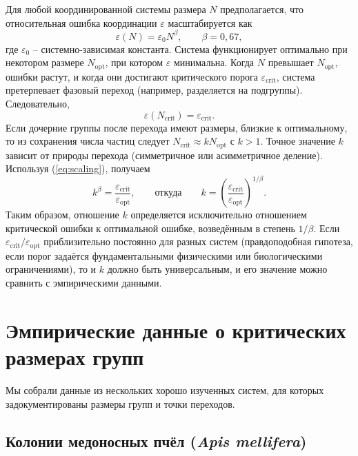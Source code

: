 \documentclass[12pt]{article}
\theoremstyle{remark}
\begin{document}
	Для любой координированной системы размера $N$ предполагается, что относительная ошибка координации $\varepsilon$ масштабируется как
	\begin{equation}
		\varepsilon(N) = \varepsilon_0 N^{\beta}, \qquad \beta = 0,67,
		\label{eq:scaling}
	\end{equation}
	где $\varepsilon_0$ – системно-зависимая константа. Система функционирует оптимально при некотором размере $N_{\text{opt}}$, при котором $\varepsilon$ минимальна. Когда $N$ превышает $N_{\text{opt}}$, ошибки растут, и когда они достигают критического порога $\varepsilon_{\text{crit}}$, система претерпевает фазовый переход (например, разделяется на подгруппы). Следовательно,
	\begin{equation}
		\varepsilon(N_{\text{crit}}) = \varepsilon_{\text{crit}}.
	\end{equation}
	Если дочерние группы после перехода имеют размеры, близкие к оптимальному, то из сохранения числа частиц следует $N_{\text{crit}} \approx k N_{\text{opt}}$ с $k > 1$. Точное значение $k$ зависит от природы перехода (симметричное или асимметричное деление). Используя (\ref{eq:scaling}), получаем
	\begin{equation}
		k^{\beta} = \frac{\varepsilon_{\text{crit}}}{\varepsilon_{\text{opt}}}, 
		\qquad\text{откуда}\qquad 
		k = \left( \frac{\varepsilon_{\text{crit}}}{\varepsilon_{\text{opt}}} \right)^{1/\beta}.
		\label{eq:k}
	\end{equation}
	Таким образом, отношение $k$ определяется исключительно отношением критической ошибки к оптимальной ошибке, возведённым в степень $1/\beta$. Если $\varepsilon_{\text{crit}}/\varepsilon_{\text{opt}}$ приблизительно постоянно для разных систем (правдоподобная гипотеза, если порог задаётся фундаментальными физическими или биологическими ограничениями), то и $k$ должно быть универсальным, и его значение можно сравнить с эмпирическими данными.
	
	\section{Эмпирические данные о критических размерах групп}
	\label{sec:data}
	
	Мы собрали данные из нескольких хорошо изученных систем, для которых задокументированы размеры групп и точки переходов.
	
	\subsection{Колонии медоносных пчёл (\textit{Apis mellifera})}
	\label{subsec:bees}
	
\end{document}
